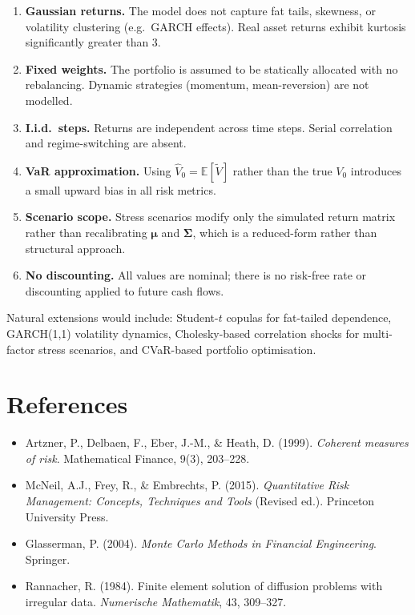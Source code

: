 \documentclass[12pt, a4paper]{article}
\begin{document}
\begin{enumerate}
    \item \textbf{Gaussian returns.} The model does not capture fat tails,
          skewness, or volatility clustering (e.g.\ GARCH effects). Real asset
          returns exhibit kurtosis significantly greater than 3.

    \item \textbf{Fixed weights.} The portfolio is assumed to be statically
          allocated with no rebalancing. Dynamic strategies (momentum,
          mean-reversion) are not modelled.

    \item \textbf{I.i.d.\ steps.} Returns are independent across time steps.
          Serial correlation and regime-switching are absent.

    \item \textbf{VaR approximation.} Using $\hat{V}_0 = \mathbb{E}[\widetilde{V}]$
          rather than the true $V_0$ introduces a small upward bias in all risk
          metrics.

    \item \textbf{Scenario scope.} Stress scenarios modify only the simulated
          return matrix rather than recalibrating $\bm{\mu}$ and $\bm{\Sigma}$,
          which is a reduced-form rather than structural approach.

    \item \textbf{No discounting.} All values are nominal; there is no risk-free
          rate or discounting applied to future cash flows.
\end{enumerate}

Natural extensions would include: Student-$t$ copulas for fat-tailed dependence,
GARCH(1,1) volatility dynamics, Cholesky-based correlation shocks for
multi-factor stress scenarios, and CVaR-based portfolio optimisation.

\section*{References}

\begin{itemize}[noitemsep]
    \item Artzner, P., Delbaen, F., Eber, J.-M., \& Heath, D. (1999).
          \textit{Coherent measures of risk}. Mathematical Finance, 9(3), 203--228.
    \item McNeil, A.J., Frey, R., \& Embrechts, P. (2015).
          \textit{Quantitative Risk Management: Concepts, Techniques and Tools}
          (Revised ed.). Princeton University Press.
    \item Glasserman, P. (2004).
          \textit{Monte Carlo Methods in Financial Engineering}. Springer.
    \item Rannacher, R. (1984). Finite element solution of diffusion problems
          with irregular data. \textit{Numerische Mathematik}, 43, 309--327.
\end{itemize}
\end{document}
